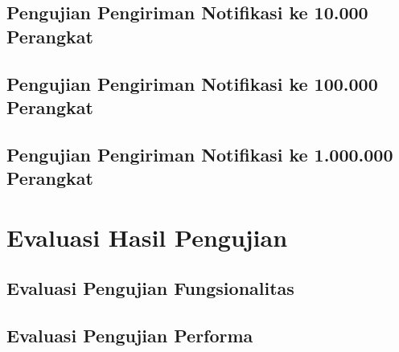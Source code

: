 \subsection{Pengujian Pengiriman Notifikasi ke 10.000 Perangkat}

\subsection{Pengujian Pengiriman Notifikasi ke 100.000 Perangkat}

\subsection{Pengujian Pengiriman Notifikasi ke 1.000.000 Perangkat}

\section{Evaluasi Hasil Pengujian}

\subsection{Evaluasi Pengujian Fungsionalitas}

\subsection{Evaluasi Pengujian Performa}
